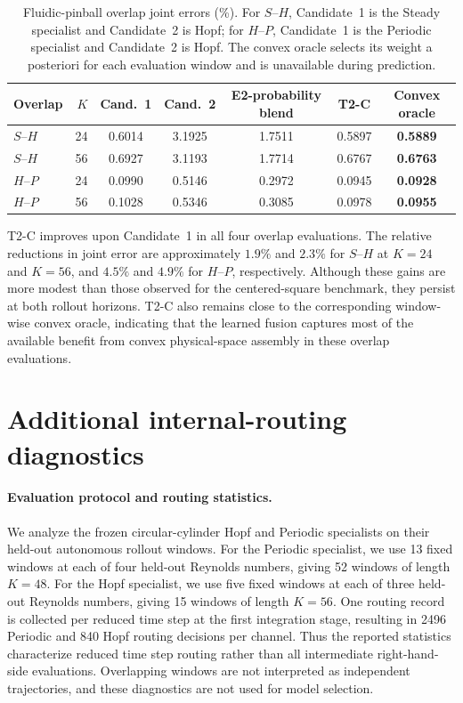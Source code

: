 \documentclass{article}
\begin{document}
\par


\begin{table}[H]
\centering
\caption{
Fluidic-pinball overlap joint errors (\%). For $S$--$H$, Candidate~1 is the Steady specialist and Candidate~2 is Hopf; for $H$--$P$, Candidate~1 is the Periodic specialist and Candidate~2 is Hopf.
The convex oracle selects its weight a posteriori for each evaluation window and is unavailable during prediction.
}
\label{tab:pinball_overlap}
\small
\setlength{\tabcolsep}{3.5pt}
\begin{tabular}{lrccccc}
\toprule
Overlap & $K$ & Cand.~1 & Cand.~2 & E2-probability blend & T2-C & Convex oracle \\
\midrule
$S$--$H$ & 24 & 0.6014 & 3.1925 & 1.7511 & 0.5897 & \textbf{0.5889} \\
$S$--$H$ & 56 & 0.6927 & 3.1193 & 1.7714 & 0.6767 & \textbf{0.6763} \\
$H$--$P$ & 24 & 0.0990 & 0.5146 & 0.2972 & 0.0945 & \textbf{0.0928} \\
$H$--$P$ & 56 & 0.1028 & 0.5346 & 0.3085 & 0.0978 & \textbf{0.0955} \\
\bottomrule
\end{tabular}
\end{table}


\par

T2-C improves upon Candidate~1 in all four overlap evaluations.
The relative reductions in joint error are approximately $1.9\%$ and
$2.3\%$ for $S$--$H$ at $K=24$ and $K=56$, and $4.5\%$ and $4.9\%$
for $H$--$P$, respectively. Although these gains are more modest than those observed for the centered-square benchmark, they persist at both rollout horizons. T2-C also remains close to the corresponding window-wise convex oracle, indicating that the learned fusion captures most of the available benefit from convex physical-space assembly in these overlap evaluations.

\FloatBarrier
\section{Additional internal-routing diagnostics}
\label{app:internal_routing}

\paragraph{Evaluation protocol and routing statistics.}
We analyze the frozen circular-cylinder Hopf and Periodic specialists on their held-out autonomous rollout windows.
For the Periodic specialist, we use 13 fixed windows at each of four held-out Reynolds numbers, giving 52 windows of length $K=48$. For the Hopf specialist, we use five fixed windows at each of three held-out Reynolds numbers, giving 15 windows of length $K=56$. One routing record is collected per reduced time step at the first integration stage, resulting in 2496 Periodic and 840 Hopf routing decisions per channel. Thus the reported statistics characterize reduced time step routing rather than all intermediate right-hand-side evaluations. Overlapping windows are not interpreted as independent trajectories, and these diagnostics are not used for model selection.
\end{document}
